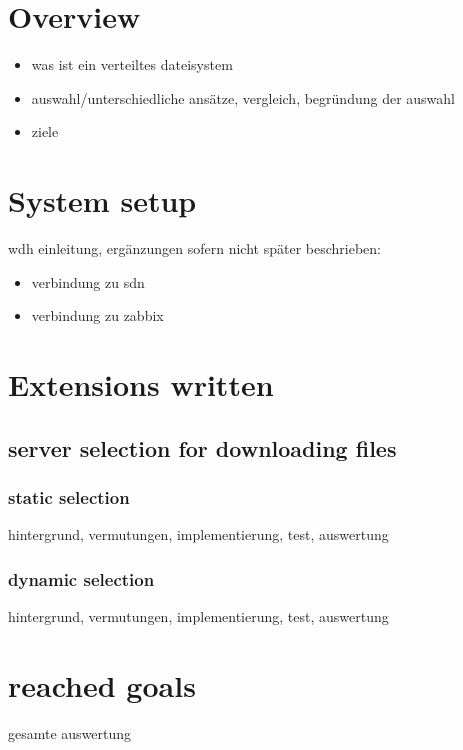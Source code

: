 
\section{Overview}

\begin{itemize}
\item was ist ein verteiltes dateisystem
\item auswahl/unterschiedliche ansätze, vergleich, begründung der auswahl
\item ziele
\end{itemize}

\section{System setup}

wdh einleitung, ergänzungen sofern nicht später beschrieben:

\begin{itemize}
\item verbindung zu sdn
\item verbindung zu zabbix
\end{itemize}

\section{Extensions written}

\subsection{server selection for downloading files}

\subsubsection{static selection}

hintergrund, vermutungen, implementierung, test, auswertung

\subsubsection{dynamic selection}

hintergrund, vermutungen, implementierung, test, auswertung

\section{reached goals}
gesamte auswertung





